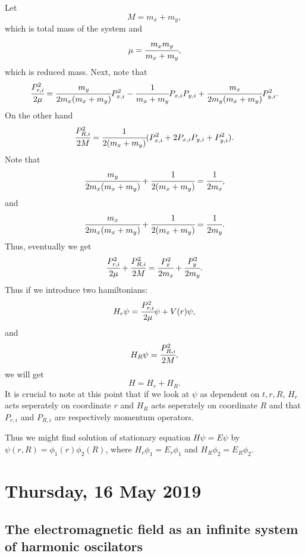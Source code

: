 \documentclass[main.tex]{subfiles}
\begin{document}
Let
\begin{equation}
M = m_x + m_y,
\end{equation}
which is total mass of the system and
\begin{equation}
\mu = \cfrac{m_xm_y}{m_x + m_y},
\end{equation}
which is reduced mass.
Next, note that
\begin{equation}
\cfrac{P^2_{r,i}}{2\mu} = \cfrac{m_y}{2m_x(m_x+m_y)}P^2_{x,i} - \cfrac{1}{m_x+m_y}P_{x,i}P_{y,i} + \cfrac{m_x}{2m_y(m_x+m_y)}P^2_{y,i}.
\end{equation}
On the other hand
\begin{equation}
\cfrac{P^2_{R,i}}{2M} = \cfrac{1}{2(m_x+m_y)}(P^2_{x,i} + 2P_{x,i}P_{y,i} + P^2_{y,i}).
\end{equation}
Note that
\begin{equation}
\cfrac{m_y}{2m_x(m_x+m_y)} + \cfrac{1}{2(m_x+m_y)} = \cfrac{1}{2m_x},
\end{equation}
and
\begin{equation}
\cfrac{m_x}{2m_x(m_x+m_y)} + \cfrac{1}{2(m_x+m_y)} = \cfrac{1}{2m_y}.
\end{equation}
Thus, eventually we get
\begin{equation}
\cfrac{P^2_{r,i}}{2\mu} + \cfrac{P^2_{R,i}}{2M} = \cfrac{P^2_x}{2m_x} + \cfrac{P^2_y}{2m_y}.
\end{equation}
Thus if we introduce two hamiltonians:
\begin{equation}
H_r \psi = \cfrac{P^2_{r,i}}{2\mu}\psi + V(r)\psi,
\end{equation}
and
\begin{equation}
H_R \psi = \cfrac{P^2_{R,i}}{2M},
\end{equation}
we will get
\begin{equation}
H = H_r + H_R.
\end{equation}
It is crucial to note at this point that if we look at $\psi$ as dependent on $t,r,R$, $H_r$ acts seperately on coordinate $r$ and $H_R$ acts seperately on coordinate $R$ and that $P_{r,i}$ and $P_{R,i}$ are respectively momentum operators.

Thus we might find solution of stationary equation $H\psi = E\psi$ by $\psi(r,R) = \phi_1(r)\phi_2(R)$, where $H_r\phi_1 = E_r\phi_1$ and $H_R\phi_2 = E_R\phi_2$.
\section{Thursday, 16 May 2019}
\subsection{The electromagnetic field as an infinite system of harmonic oscilators}
\end{document}
